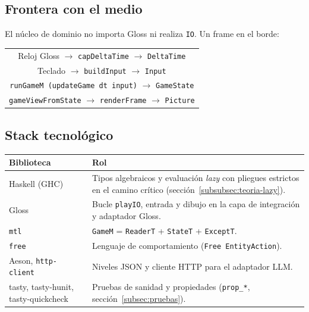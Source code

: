 \subsection{Frontera con el medio}
\label{subsec:solucion-frontera}

El núcleo de dominio no importa Gloss ni realiza \texttt{IO}. Un frame en el borde:

\begin{center}
  \begin{tabular}{@{}c@{}}
    Reloj Gloss $\rightarrow$ \texttt{capDeltaTime} $\rightarrow$ \texttt{DeltaTime} \\[0.4em]
    Teclado $\rightarrow$ \texttt{buildInput} $\rightarrow$ \texttt{Input} \\[0.4em]
    \texttt{runGameM (updateGame dt input)} $\rightarrow$ \texttt{GameState} \\[0.4em]
    \texttt{gameViewFromState} $\rightarrow$ \texttt{renderFrame} $\rightarrow$ \texttt{Picture}
  \end{tabular}
  \label{fig:flujo-frame}
\end{center}

\subsection{Stack tecnológico}
\label{subsec:solucion-stack}

\begin{samepage}
\begin{center}
  \label{tab:stack}
  \smallskip
  \begin{tabularx}{\textwidth}{@{}>{\raggedright\arraybackslash}p{3.2cm} >{\raggedright\arraybackslash}X@{}}
    \textbf{Biblioteca} & \textbf{Rol} \\
    \hline
    Haskell (GHC)~\cite{ghc967} &
    Tipos algebraicos y evaluación \textit{lazy} con pliegues estrictos en el camino crítico
    (sección~\ref{subsubsec:teoria-lazy}). \\
    Gloss~\cite{hackageSupportLibs} &
    Bucle \texttt{playIO}, entrada y dibujo en la capa de integración y adaptador Gloss. \\
    \texttt{mtl}~\cite{mtl} &
    \texttt{GameM} = \texttt{ReaderT} + \texttt{StateT} + \texttt{ExceptT}. \\
    \texttt{free}~\cite{free} &
    Lenguaje de comportamiento (\texttt{Free EntityAction}). \\
    Aeson, \texttt{http-client}~\cite{hackageSupportLibs} &
    Niveles JSON y cliente HTTP para el adaptador LLM. \\
    tasty, tasty-hunit, tasty-quickcheck~\cite{hackageSupportLibs} &
    Pruebas de sanidad y propiedades (\texttt{prop\_*}, sección~\ref{subsec:pruebas}). \\
  \end{tabularx}
\end{center}
\end{samepage}
